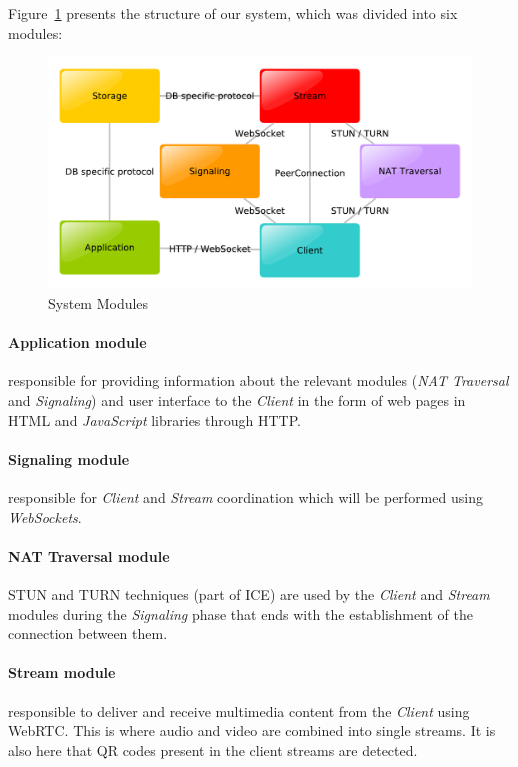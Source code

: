 \documentclass[10pt,conference]{IEEEtran}
\begin{document}
Figure~\ref{fig:modules} presents the structure of our system, which was divided into six modules:


\begin{figure}
	\centering
	\includegraphics[width=\linewidth]{figures/modules.pdf}
	\caption{System Modules}
    \label{fig:modules}
\end{figure}

\paragraph{Application module} responsible for providing information about the relevant modules (\emph{NAT Traversal} and \emph{Signaling}) and user interface to the \emph{Client} in the form of web pages in \gls{HTML} and \emph{JavaScript} libraries through \gls{HTTP}.
 
\paragraph{Signaling module} responsible for \emph{Client} and \emph{Stream} coordination which will be performed using \emph{WebSockets}.

\paragraph{NAT Traversal module} \gls{STUN} and \gls{TURN} techniques (part of \gls{ICE}) are used by the \emph{Client} and \emph{Stream} modules during the \emph{Signaling} phase that ends with the establishment of the connection between them.

\paragraph{Stream module} responsible to deliver and receive multimedia content from the \emph{Client} using \gls{WebRTC}. This is where audio and video are combined into single streams. It is also here that \gls{QR} codes present in the client streams are detected.
\end{document}
